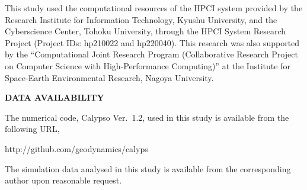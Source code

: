 \begin{acknowledgments}
This study used the computational resources of the HPCI system provided by the Research Institute for Information Technology, Kyushu University, and the Cyberscience Center, Tohoku University, through the HPCI System Research Project (Project IDs: hp210022 and hp220040). This research was also supported by the “Computational Joint Research Program (Collaborative Research Project on Computer Science with High-Performance Computing)” at the Institute for Space-Earth Environmental Research, Nagoya University.
\end{acknowledgments}

\vspace{15mm}
{\color{red}
\noindent
{\bf DATA AVAILABILITY}

\noindent
The numerical code, Calypso Ver.~1.2, used in this study is available from the following URL,

\noindent
http://github.com/geodynamics/calyps

The simulation data analysed in this study is available from the corresponding author upon reasonable request.
}